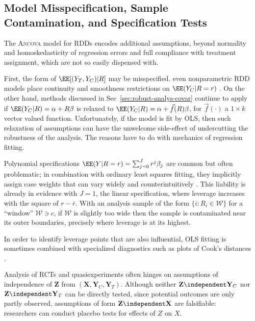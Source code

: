 \subsection{Model Misspecification, Sample Contamination, and Specification Tests}\label{sec:specification}

The \textsc{Ancova} model for RDDs encodes additional assumptions,
beyond normality and homoskedasticity of regression errors and full
compliance with treatment assignment, which are not so easily
dispensed with.





\sloppy
First, the form of $\EE[(Y_{T}, Y_{C}) | R]$ may be misspecified.
even nonparametric RDD models
place continuity and smoothness restrictions on $\EE(Y_{C}| R=r)$ \citep[\S~5]{lee2008regression, kolesarRothe17}.
On the other hand, methods discussed in Sec~\ref{sec:robust-analys-covar} continue to
apply if $\EE (Y_{C}| R) = \alpha + R\beta$ is relaxed to
$\EE (Y_{C}| R) = \alpha + \vec{f}(R)\beta$, for
$\vec{f}(\cdot)$ a $1 \times k$ vector valued function.
Unfortunately, if the model is fit by OLS, then such relaxation of assumptions can have the unwelcome
side-effect of undercutting the robustness of the analysis.  The
reasons have to do with mechanics of regression fitting.

Polynomial specifications
$\EE(Y | R=r) = \sum_{j=0}^{J} r^{j} \beta_{j}$ are common but often
problematic; in combination with ordinary least squares fitting, they
implicitly assign case weights that can vary widely and
counterintuitively \citep{gelman2016high}.
This liability is already
in evidence with $J=1$, the linear specification, where leverage
increases with the square of $r -\bar{r}$.  With an analysis sample
of the form $\{i : R_{i} \in \mathcal{W}\}$ for a ``window''
$\mathcal{W} \ni c$, if $\mathcal{W}$ is slightly too wide then the
sample is contaminated near its outer boundaries, precisely
where leverage is at its highest.

In order to identify leverage points that are also influential,
OLS fitting is sometimes combined with specialized diagnostics such as
plots of Cook's distances
 \citeyearpar{cook1982residuals}.


Analysis of RCTs and quasiexperiments often hinges on assumptions of
independence of
 $\mathbf{Z}$ from $(\mathbf{X}, \mathbf{Y}_{C}, \mathbf{Y}_{T})$.
 Although neither $\mathbf{Z} \independent \mathbf{Y}_{C}$ nor
 $\mathbf{Z} \independent \mathbf{Y}_{T}$ can be directly tested,
 since potential outcomes are only partly observed, assumptions of form
 $\mathbf{Z} \independent \mathbf{X}$ are falsifiable: researchers can
 conduct placebo tests for effects of $Z$ on $X$.

